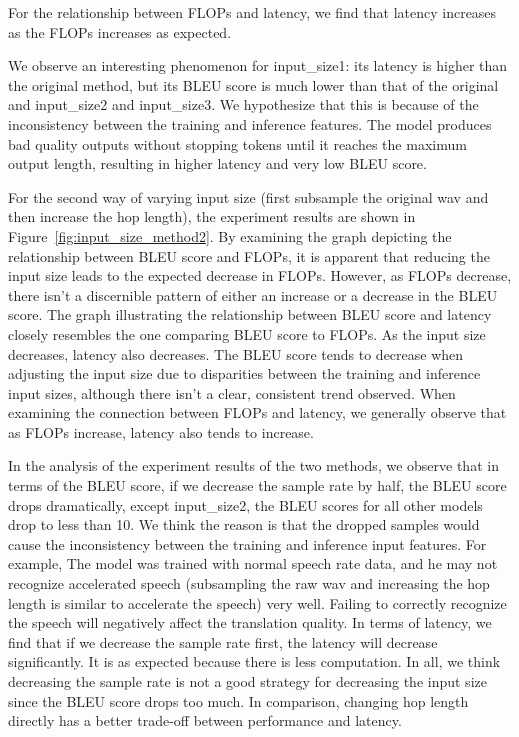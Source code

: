 \documentclass[11pt]{article}
\begin{document}
For the relationship between FLOPs and latency, we find that latency increases as the FLOPs increases as expected.  

We observe an interesting phenomenon for input\_size1: its latency is higher than the original method, but its BLEU score is much lower than that of the original and input\_size2 and input\_size3. We hypothesize that this is because of the inconsistency between the training and inference features. The model produces bad quality outputs without stopping tokens until it reaches the maximum output length, resulting in higher latency and very low BLEU score.

For the second way of varying input size (first subsample the original wav and then increase the hop length), the experiment results are shown in Figure~\ref{fig:input_size_method2}. By examining the graph depicting the relationship between BLEU score and FLOPs, it is apparent that reducing the input size leads to the expected decrease in FLOPs. However, as FLOPs decrease, there isn't a discernible pattern of either an increase or a decrease in the BLEU score. The graph illustrating the relationship between BLEU score and latency closely resembles the one comparing BLEU score to FLOPs. As the input size decreases, latency also decreases. The BLEU score tends to decrease when adjusting the input size due to disparities between the training and inference input sizes, although there isn't a clear, consistent trend observed. When examining the connection between FLOPs and latency, we generally observe that as FLOPs increase, latency also tends to increase.


In the analysis of the experiment results of the two methods, we observe that in terms of the BLEU score, if we decrease the sample rate by half, the BLEU score drops dramatically, except input\_size2, the BLEU scores for all other models drop to less than 10. We think the reason is that the dropped samples would cause the inconsistency between the training and inference input features. For example, The model was trained with normal speech rate data, and he may not recognize accelerated speech (subsampling the raw wav and increasing the hop length is similar to accelerate the speech) very well. Failing to correctly recognize the speech will negatively affect the translation quality. In terms of latency, we find that if we decrease the sample rate first, the latency will decrease significantly. It is as expected because there is less computation. In all, we think decreasing the sample rate is not a good strategy for decreasing the input size since the BLEU score drops too much. In comparison, changing hop length directly has a better trade-off between performance and latency. 
\end{document}
